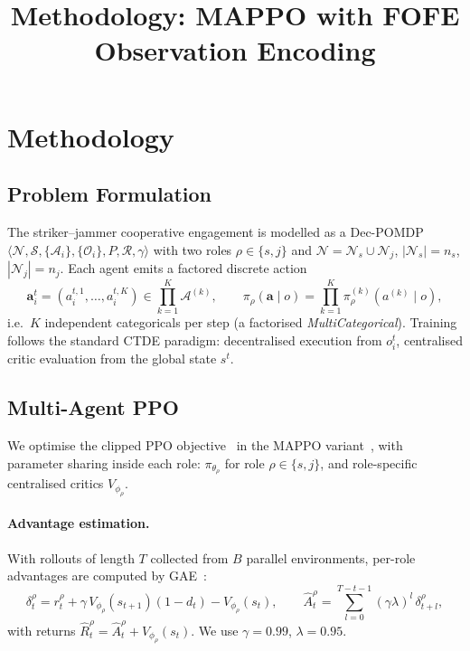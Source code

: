 \documentclass[11pt,a4paper]{article}
\title{Methodology: MAPPO with FOFE Observation Encoding}
\author{}
\date{}
\begin{document}
\maketitle

\section{Methodology}

\subsection{Problem Formulation}
The striker--jammer cooperative engagement is modelled as a Dec-POMDP
$\langle \mathcal{N},\mathcal{S},\{\mathcal{A}_i\},\{\mathcal{O}_i\},
P,\mathcal{R},\gamma\rangle$ with two roles $\rho \in \{s,j\}$ and
$\mathcal{N}=\mathcal{N}_s\cup\mathcal{N}_j$, $|\mathcal{N}_s|=n_s$,
$|\mathcal{N}_j|=n_j$. Each agent emits a factored discrete action
\begin{equation}
\bm{a}_i^t = (a_i^{t,1},\dots,a_i^{t,K}) \in \prod_{k=1}^{K} \mathcal{A}^{(k)},
\qquad
\pi_\rho(\bm{a}\mid o) = \prod_{k=1}^{K} \pi_\rho^{(k)}(a^{(k)}\mid o),
\end{equation}
i.e.\ $K$ independent categoricals per step (a factorised \emph{MultiCategorical}).
Training follows the standard CTDE paradigm: decentralised execution from
$o_i^t$, centralised critic evaluation from the global state $s^t$.

\subsection{Multi-Agent PPO}
We optimise the clipped PPO objective~\cite{schulman2017ppo} in the MAPPO
variant~\cite{yu2022mappo}, with parameter sharing inside each role:
$\pi_{\theta_\rho}$ for role $\rho\in\{s,j\}$, and role-specific centralised
critics $V_{\phi_\rho}$.

\paragraph{Advantage estimation.}
With rollouts of length $T$ collected from $B$ parallel environments, per-role
advantages are computed by GAE~\cite{schulman2016gae}:
\begin{equation}
\delta_t^{\rho} = r_t^{\rho} + \gamma\, V_{\phi_\rho}(s_{t+1})(1-d_t) - V_{\phi_\rho}(s_t),
\qquad
\hat{A}_t^{\rho} = \sum_{l=0}^{T-t-1}(\gamma\lambda)^{l}\,\delta_{t+l}^{\rho},
\end{equation}
with returns $\hat{R}_t^\rho=\hat{A}_t^\rho+V_{\phi_\rho}(s_t)$.
We use $\gamma=0.99$, $\lambda=0.95$.
\end{document}
